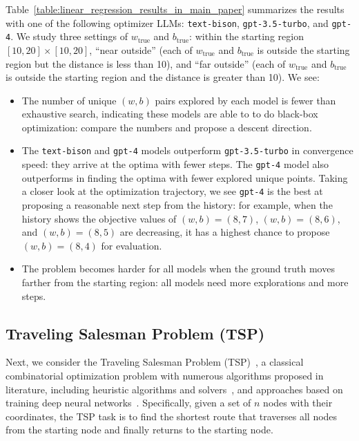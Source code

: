 Table~\ref{table:linear_regression_results_in_main_paper} summarizes the results with one of the following optimizer LLMs: \texttt{text-bison}, \texttt{gpt-3.5-turbo}, and \texttt{gpt-4}.
We study three settings of $w_\text{true}$ and $b_\text{true}$: within the starting region $[10, 20] \times [10, 20]$, ``near outside'' (each of $w_\text{true}$ and $b_\text{true}$ is outside the starting region but the distance is less than 10), and ``far outside'' (each of $w_\text{true}$ and $b_\text{true}$ is outside the starting region and the distance is greater than 10).
We see:
\begin{itemize}[leftmargin=2em,topsep=0pt,partopsep=1ex,parsep=0ex]
\item The number of unique $(w, b)$ pairs explored by each model is fewer than exhaustive search, indicating these models are able to to do black-box optimization: compare the numbers and propose a descent direction.
\item The \texttt{text-bison} and \texttt{gpt-4} models outperform \texttt{gpt-3.5-turbo} in convergence speed: they arrive at the optima with fewer steps.
The \texttt{gpt-4} model also outperforms in finding the optima with fewer explored unique points. 
Taking a closer look at the optimization trajectory, we see \texttt{gpt-4} is the best at proposing a reasonable next step from the history: for example, when the history shows the objective values of $(w, b) = (8, 7)$, $(w, b) = (8, 6)$, and $(w, b) = (8, 5)$ are decreasing, it has a highest chance to propose $(w, b) = (8, 4)$ for evaluation.
\item The problem becomes harder for all models when the ground truth moves farther from the starting region: all models need more explorations and more steps.
\end{itemize}

\subsection{Traveling Salesman Problem (TSP)}
Next, we consider the Traveling Salesman Problem (TSP)~\citep{junger1995traveling,gutin2006traveling}, a classical combinatorial optimization problem with numerous algorithms proposed in literature, including heuristic algorithms and solvers~\citep{rosenkrantz1977analysis,golden1980approximate,optimization2020gurobi,applegate2006concorde,helsgaun2017extension}, and approaches based on training deep neural networks~\citep{kool2018attention,deudon2018learning,chen2019learning,nazari2018reinforcement}. 
Specifically, given a set of $n$ nodes with their coordinates, the TSP task is to find the shortest route that traverses all nodes from the starting node and finally returns to the starting node.

